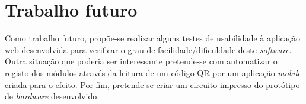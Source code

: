 



\section{Trabalho futuro}



Como trabalho futuro, propõe-se realizar alguns testes de usabilidade à aplicação web desenvolvida para verificar o grau de facilidade/dificuldade deste \textit{software}. Outra situação que poderia ser interessante pretende-se com automatizar o registo dos módulos através da leitura de um código \ac{QR} por um aplicação \textit{mobile} criada para o efeito. Por fim, pretende-se criar um circuito impresso do protótipo de \textit{hardware} desenvolvido. 











 
